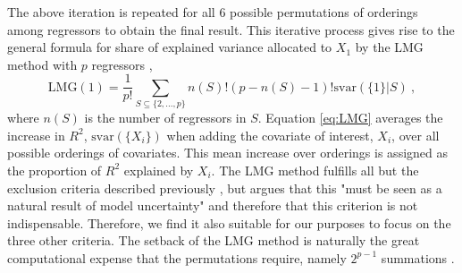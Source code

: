 The above iteration is repeated for all 6 possible permutations of orderings among regressors to obtain the final result.
This iterative process gives rise to the general formula for share of explained variance allocated to $X_1$ by the LMG method with $p$ regressors \citep{gromping_relaimpo},
\begin{equation}
    \label{eq:LMG}
    \text{LMG}(1) = \frac{1}{p!} \sum_{S \subseteq \{2, ..., p\}} n(S)! (p - n(S)-1)! \text{svar}(\{1\} \lvert S) \ ,
\end{equation} 
where $n(S)$ is the number of regressors in $S$.
Equation \eqref{eq:LMG} averages the increase in $R^2$, $\text{svar}(\{X_i\})$ when adding the covariate of interest, $X_i$, over all possible orderings of covariates. 
This mean increase over orderings is assigned as the proportion of $R^2$ explained by $X_i$.
The LMG method fulfills all but the exclusion criteria described previously \citep{gromping_relaimpo}, but \citet{gromping_relaimpo} argues that this "must be seen as a natural result of model uncertainty" and therefore that this criterion is not indispensable.
Therefore, we find it also suitable for our purposes to focus on the three other criteria.
The setback of the LMG method is naturally the great computational expense that the permutations require, namely $2^{p-1}$ summations \citep{gromping_relaimpo}. 

